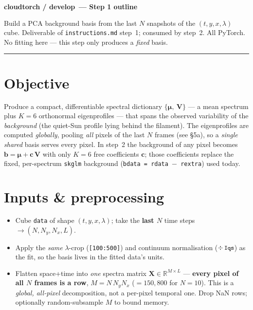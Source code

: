 \documentclass[10pt,a4paper]{article}
\newcommand{\co}[1]{{\small\texttt{#1}}}
\begin{document}
\small

{\sffamily\bfseries\large\color{acc} cloudtorch / develop\, --- Step 1 outline}

\vspace{1pt}
{\sffamily\color{gry}\footnotesize Build a PCA background basis from the last $N$ snapshots of the $(t,y,x,\lambda)$ cube. Deliverable of \co{instructions.md} step~1; consumed by step~2. All PyTorch. No fitting here --- this step only produces a \emph{fixed} basis.}

\vspace{1pt}
{\footnotesize\color{gry}\rule{\textwidth}{0.4pt}}

\section{Objective}

Produce a compact, differentiable spectral dictionary $\{\boldsymbol\mu,\ \mathbf V\}$ --- a mean spectrum plus $K=6$ orthonormal eigenprofiles --- that spans the observed variability of the \emph{background} (the quiet-Sun profile lying behind the filament). The eigenprofiles are computed \emph{globally}, pooling \emph{all} pixels of the last $N$ frames (see \S5a), so a \emph{single shared} basis serves every pixel. In step~2 the background of any pixel becomes $\mathbf b = \boldsymbol\mu + \mathbf c\,\mathbf V$ with only $K=6$ free coefficients $\mathbf c$; those coefficients replace the fixed, per-spectrum \co{skglm} background (\co{bdata\,=\,rdata\,$-$\,rextra}) used today.

\section{Inputs \& preprocessing}

\begin{itemize}
\item Cube \co{data} of shape $(t,y,x,\lambda)$; take the \textbf{last $N$} time steps $\rightarrow (N,N_y,N_x,L)$.
\item Apply the \emph{same} $\lambda$-crop (\co{[100:500]}) and continuum normalisation ($\div\,\co{Iqs}$) as the fit, so the basis lives in the fitted data's units.
\item Flatten space+time into \emph{one} spectra matrix $\mathbf X\in\mathbb R^{M\times L}$ --- \textbf{every pixel of all $N$ frames is a row}, $M=N\,N_yN_x$ ($=150{,}800$ for $N{=}10$). This is a \emph{global, all-pixel} decomposition, not a per-pixel temporal one. Drop NaN rows; optionally random-subsample $M$ to bound memory.
\end{itemize}
\end{document}
